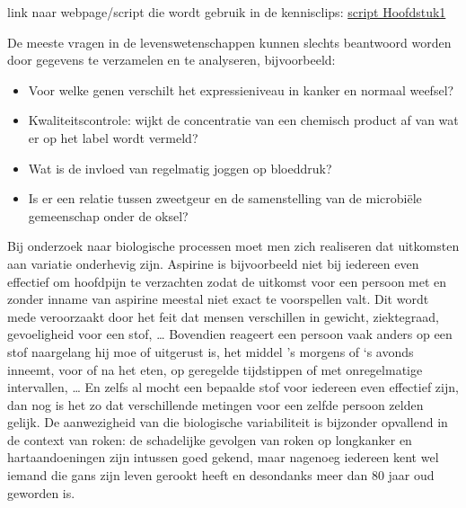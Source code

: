 \documentclass[
  12pt,dutch,coursenotes]{book}
\providecommand{\tightlist}{%
  \setlength{\itemsep}{0pt}\setlength{\parskip}{0pt}}
\theoremstyle{definition}
\theoremstyle{definition}
\theoremstyle{definition}
\theoremstyle{remark}
\begin{document}
link naar webpage/script die wordt gebruik in de kennisclips: \href{https://statomics.github.io/sbc20/rmd/01-intro.html}{script Hoofdstuk1}

De meeste vragen in de levenswetenschappen kunnen slechts beantwoord worden door gegevens te verzamelen en te analyseren, bijvoorbeeld:

\begin{itemize}
\tightlist
\item
  Voor welke genen verschilt het expressieniveau in kanker en normaal weefsel?
\item
  Kwaliteitscontrole: wijkt de concentratie van een chemisch product af van wat er op het label wordt vermeld?\\
\item
  Wat is de invloed van regelmatig joggen op bloeddruk?
\item
  Is er een relatie tussen zweetgeur en de samenstelling van de microbiële gemeenschap onder de oksel?
\end{itemize}

Bij onderzoek naar biologische processen moet men zich realiseren dat uitkomsten aan variatie onderhevig zijn. Aspirine is bijvoorbeeld niet bij iedereen even effectief om hoofdpijn te verzachten zodat de uitkomst voor een persoon met en zonder inname van aspirine meestal niet exact te voorspellen valt. Dit wordt mede veroorzaakt door het feit dat mensen verschillen in gewicht, ziektegraad, gevoeligheid voor een stof, \ldots{} Bovendien reageert een persoon vaak anders op een stof naargelang hij moe of uitgerust is, het middel 's morgens of `s avonds inneemt, voor of na het eten, op geregelde tijdstippen of met onregelmatige intervallen, \ldots{} En zelfs al mocht een bepaalde stof voor iedereen even effectief zijn, dan nog is het zo dat verschillende metingen voor een zelfde persoon zelden gelijk.
De aanwezigheid van die biologische variabiliteit is bijzonder opvallend in de context van roken: de schadelijke gevolgen van roken op longkanker en hartaandoeningen zijn intussen goed gekend, maar nagenoeg iedereen kent wel iemand die gans zijn leven gerookt heeft en desondanks meer dan 80 jaar oud geworden is.
\end{document}
